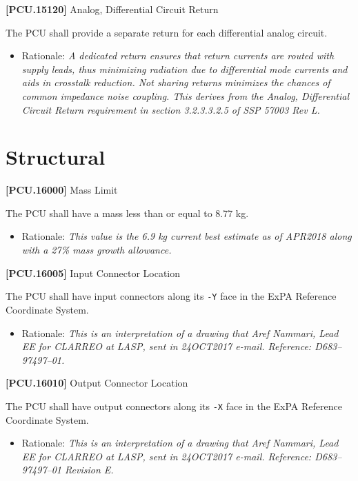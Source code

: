 \textbf{[PCU.15120]} Analog, Differential Circuit Return

The \gls{PCU} shall provide a separate return for each differential analog circuit.

\begin{itemize}
\item{} Rationale: \emph{A dedicated return ensures that return currents are routed with supply leads, thus minimizing radiation due to differential mode currents and aids in crosstalk reduction. Not sharing returns minimizes the chances of common impedance noise coupling. This derives from the Analog, Differential Circuit Return requirement in section 3.2.3.3.2.5 of SSP 57003 Rev L.}

\end{itemize}

\section{Structural}
\label{structural}

\textbf{[PCU.16000]} Mass Limit

The \gls{PCU} shall have a mass less than or equal to 8.77 kg.

\begin{itemize}
\item{} Rationale: \emph{This value is the 6.9 kg current best estimate as of APR2018 along with a 27\% mass growth allowance.}

\end{itemize}

\textbf{[PCU.16005]} Input Connector Location

The \gls{PCU} shall have input connectors along its \texttt{-Y} face in the \gls{ExPA} Reference Coordinate System.

\begin{itemize}
\item{} Rationale: \emph{This is an interpretation of a drawing that Aref Nammari, Lead EE for CLARREO at LASP, sent in 24OCT2017 e-mail. Reference: D683--97497--01.}

\end{itemize}

\textbf{[PCU.16010]} Output Connector Location

The \gls{PCU} shall have output connectors along its \texttt{-X} face in the \gls{ExPA} Reference Coordinate System.

\begin{itemize}
\item{} Rationale: \emph{This is an interpretation of a drawing that Aref Nammari, Lead EE for CLARREO at LASP, sent in 24OCT2017 e-mail. Reference: D683--97497--01 Revision E.}

\end{itemize}


